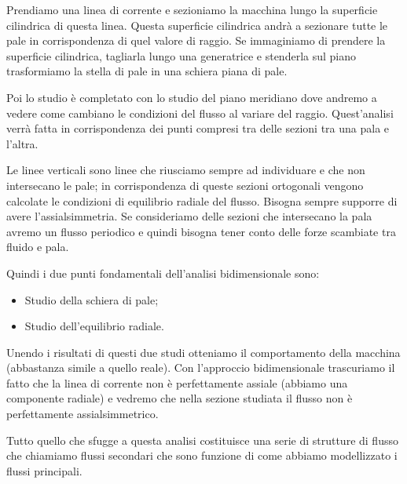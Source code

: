 Prendiamo una linea di corrente e sezioniamo la macchina lungo la superficie
cilindrica di questa linea. Questa superficie cilindrica andrà a sezionare tutte le
pale in corrispondenza di quel valore di raggio. Se immaginiamo di prendere la
superficie cilindrica, tagliarla lungo una generatrice e stenderla sul piano
trasformiamo la stella di pale in una schiera piana di pale.

Poi lo studio è completato con lo studio del piano meridiano dove andremo a
vedere come cambiano le condizioni del flusso al variare del raggio.
Quest'analisi verrà fatta in corrispondenza dei punti compresi tra delle sezioni
tra una pala e l’altra. 

Le linee verticali sono linee che riusciamo sempre ad
individuare e che non intersecano le pale; in corrispondenza di queste sezioni
ortogonali vengono calcolate le condizioni di equilibrio radiale del flusso.
Bisogna sempre supporre di avere l'assialsimmetria. Se consideriamo delle
sezioni che intersecano la pala avremo un flusso periodico e quindi bisogna
tener conto delle forze scambiate tra fluido e pala.

Quindi i due punti fondamentali dell'analisi bidimensionale sono:
\begin{itemize}
\item Studio della schiera di pale;
\item Studio dell'equilibrio radiale.
\end{itemize}
Unendo i risultati di questi due studi otteniamo il comportamento della
macchina (abbastanza simile a quello reale).
Con l’approccio bidimensionale trascuriamo il fatto che la linea di corrente non
è perfettamente assiale (abbiamo una componente radiale) e vedremo che
nella sezione studiata il flusso non è perfettamente assialsimmetrico.

Tutto quello che sfugge a questa analisi costituisce una serie di strutture di flusso
che chiamiamo flussi secondari che sono funzione di come abbiamo modellizzato
i flussi principali.


